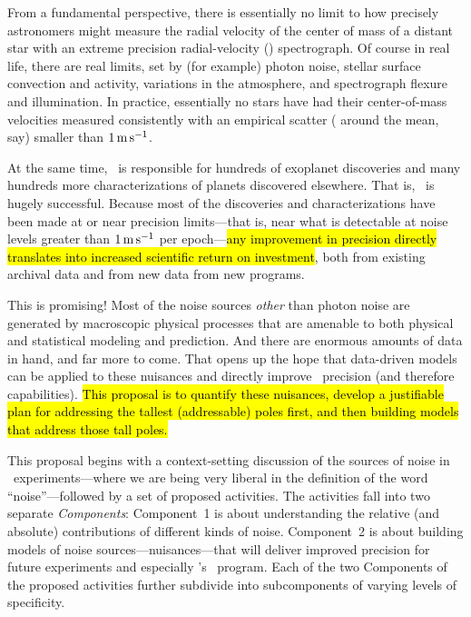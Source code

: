 \documentclass[12pt, fullpage, letterpaper]{article}
\begin{document}
\noindent
From a fundamental perspective, there is essentially no limit to how
precisely astronomers might measure the radial velocity of the center of mass
of a distant star with an extreme precision radial-velocity (\EPRV) spectrograph.
Of course in real life, there are real limits, set
by (for example) photon noise, stellar surface convection and activity,
variations in the atmosphere, and spectrograph flexure and illumination. In practice,
essentially no stars have had their center-of-mass velocities measured
consistently with an empirical scatter ( around the mean,
say) smaller than $1\,{\mathrm{m\,s^{-1}}}$.

At the same time, \EPRV\ is responsible for hundreds of 
exoplanet discoveries and many hundreds more 
characterizations of planets
discovered elsewhere. That is, \EPRV\ is hugely successful.
Because most of the discoveries and characterizations have been made
at or near precision limits---that is, near what is detectable at noise levels
greater than $1\,{\mathrm{m\,s^{-1}}}$ per epoch---\hl{any improvement in precision directly
translates into increased scientific return on investment},
both from existing archival data and from new data from new programs.

This is promising! Most of the noise sources \emph{other} than photon noise
are generated by macroscopic physical processes that are amenable to both
physical and statistical modeling and prediction. And there are enormous amounts
of data in hand, and far more to come. That opens up the hope
that data-driven models can be applied to these nuisances and directly improve
\EPRV\ precision (and therefore capabilities). \hl{This proposal is to quantify
these nuisances, develop a justifiable plan for addressing the tallest
(addressable) poles first, and then building models that address those tall
poles.}

This proposal begins with a context-setting discussion of the sources
of noise in \EPRV\ experiments---where we are being very liberal in the definition of the
word ``noise''---followed by a set of proposed activities. The activities fall into two
separate \emph{Components}: Component~1 is about understanding the relative
(and absolute) contributions of different kinds of noise. Component~2
is about building models of noise sources---nuisances---that will
deliver improved precision for future experiments and especially \NASA's
\NNEXPLORE\ program. Each of the two Components of the proposed activities
further subdivide into subcomponents of varying levels of specificity.
\end{document}
